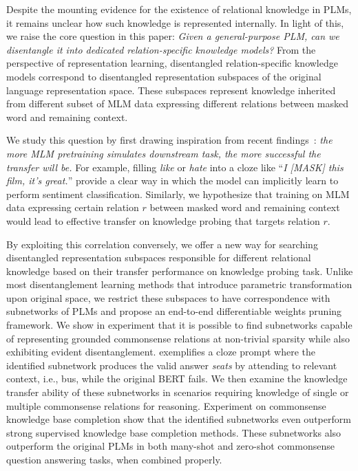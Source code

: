 Despite the mounting evidence for the existence of relational knowledge in PLMs, it remains unclear how such knowledge is represented internally. In light of this, we raise the core question in this paper:
\textit{Given a general-purpose PLM, can we disentangle it into dedicated relation-specific knowledge models?} From the perspective of representation learning, disentangled relation-specific knowledge models correspond to disentangled representation subspaces of the original language representation space. These subspaces represent knowledge inherited from different subset of MLM data expressing different relations between masked word and remaining context.


We study this question by first drawing inspiration from recent findings~\citep{DBLP:journals/corr/abs-2010-03648,DBLP:journals/corr/abs-2008-01064,inductivemlm}: \textit{the more  MLM pretraining simulates downstream task, the more successful the  transfer will be.} For example, filling \textit{like} or \textit{hate} into a cloze like ``\textit{I [MASK] this film, it's great.}'' provide a clear way in which the model can implicitly learn to perform sentiment classification. Similarly, we hypothesize that training on MLM data expressing certain relation $r$ between masked word and remaining context would lead to effective transfer on knowledge probing that targets relation $r$. 

By exploiting this correlation conversely, we offer a new way for searching disentangled representation subspaces responsible for different relational knowledge based on their transfer performance on knowledge probing task. Unlike most disentanglement learning methods that introduce parametric transformation upon original space, we restrict these subspaces to have correspondence with subnetworks of PLMs and propose an end-to-end differentiable weights pruning framework.
We show in experiment that it is possible to find subnetworks capable of representing grounded commonsense relations at non-trivial sparsity while also exhibiting evident disentanglement.  exemplifies a cloze prompt where the identified subnetwork produces the valid answer \textit{seats} by attending to relevant 
context, i.e., bus,  while the original \textsc{BERT} fails. We then examine the knowledge transfer ability of these subnetworks in scenarios requiring knowledge of single or multiple commonsense relations for reasoning. Experiment on commonsense knowledge base completion show that the identified subnetworks even outperform strong supervised knowledge base completion methods. These subnetworks also outperform the original PLMs in both many-shot and zero-shot commonsense question answering tasks, when combined properly.

